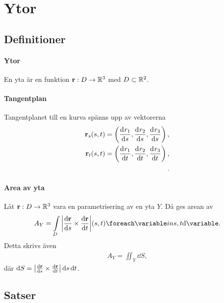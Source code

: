 \section{Ytor}

\subsection{Definitioner}

\paragraph{Ytor}
En yta är en funktion $\vect{r}: D\to\R^3$ med $D\subset\mathbb{R}^2$.

\paragraph{Tangentplan}
Tangentplanet till en kurva spänns upp av vektorerna
\begin{align*}
	\vect{r}_s(s, t) = \left(\deval{r_1}{s}{s, t}, \deval{r_2}{s}{s, t}, \deval{r_3}{s}{s, t}\right), \\
	\vect{r}_t(s, t) = \left(\deval{r_1}{t}{s, t}, \deval{r_2}{t}{s, t}, \deval{r_3}{t}{s, t}\right), \\.
\end{align*}

\paragraph{Area av yta}
Låt $\vect{r}: D\to\R^3$ vara en parametrisering av en yta $Y$. Då ges arean av
\begin{align*}
	A_Y = \inteval{D}{\abs{\dv{\vect{r}}{s}\times\dv{\vect{r}}{t}}}{{s, t}}. 
\end{align*}
Detta skrivs även
\begin{align*}
	A_Y = \iint_{Y}\dd{S},
\end{align*}
där $\dd{S} = \abs{\dv{\vect{r}}{s}\times\dv{\vect{r}}{t}}\dd{s}\dd{t}$.

\subsection{Satser}